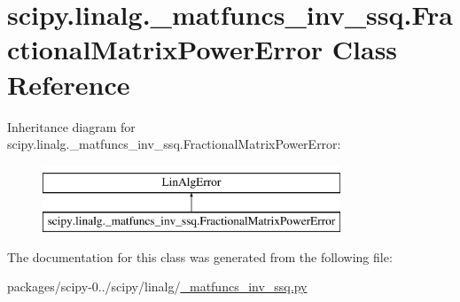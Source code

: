 \hypertarget{classscipy_1_1linalg_1_1__matfuncs__inv__ssq_1_1FractionalMatrixPowerError}{}\section{scipy.\+linalg.\+\_\+matfuncs\+\_\+inv\+\_\+ssq.\+Fractional\+Matrix\+Power\+Error Class Reference}
\label{classscipy_1_1linalg_1_1__matfuncs__inv__ssq_1_1FractionalMatrixPowerError}
Inheritance diagram for scipy.\+linalg.\+\_\+matfuncs\+\_\+inv\+\_\+ssq.\+Fractional\+Matrix\+Power\+Error\+:\begin{figure}[H]
\begin{center}
\leavevmode
\includegraphics[height=2.000000cm]{classscipy_1_1linalg_1_1__matfuncs__inv__ssq_1_1FractionalMatrixPowerError}
\end{center}
\end{figure}


The documentation for this class was generated from the following file\+:\begin{DoxyCompactItemize}
\item 
packages/scipy-\/0../scipy/linalg/\hyperlink{__matfuncs__inv__ssq_8py}{\+\_\+matfuncs\+\_\+inv\+\_\+ssq.\+py}\end{DoxyCompactItemize}
